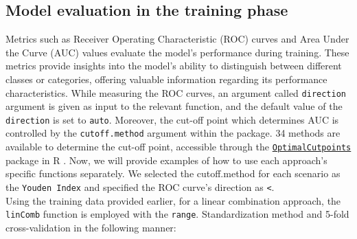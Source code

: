 \documentclass[10pt]{article}
\newcommand{\CRANpkg}[1]{\href{https://cran.r-project.org/web/packages/#1/index.html}{\texttt{#1}}}
\begin{document}
\subsection{Model evaluation in the training phase}
Metrics such as Receiver Operating Characteristic (ROC) curves and Area Under the Curve (AUC) values evaluate the model's performance during training. These metrics provide insights into the model's ability to distinguish between different classes or categories, offering valuable information regarding its performance characteristics. While measuring the ROC curves, an argument called \texttt{direction} argument is given as input to the relevant function, and the default value of the \texttt{direction} is set to \texttt{auto}. Moreover, the cut-off point which determines AUC is controlled by the \texttt{cutoff.method} argument within the package. 34 methods are available to determine the cut-off point, accessible through the \CRANpkg{OptimalCutpoints} package in R \citep{lopez2014optimalcutpoints}.
Now, we will provide examples of how to use each approach's specific functions separately. We selected the cutoff.method for each scenario as the \texttt{Youden Index} and specified the ROC curve's direction as \texttt{<}.\\
Using the training data provided earlier, for a linear combination approach, the \texttt{linComb} function is employed with the \texttt{range}. Standardization method and 5-fold cross-validation in the following manner:
\end{document}
